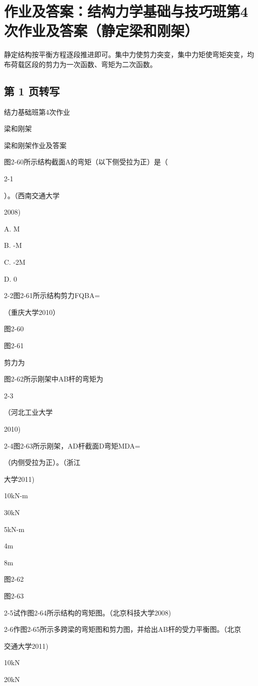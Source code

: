\section{作业及答案：结构力学基础与技巧班第4次作业及答案（静定梁和刚架）}
\begin{analysisbox}
静定结构按平衡方程逐段推进即可。集中力使剪力突变，集中力矩使弯矩突变，均布荷载区段的剪力为一次函数、弯矩为二次函数。
\end{analysisbox}
\subsection*{第 1 页转写}
结力基础班第4次作业

梁和刚架

梁和刚架作业及答案

图2-60所示结构截面A的弯矩（以下侧受拉为正）是（

2-1

）。（西南交通大学

2008)

A. M

B. -M

C. -2M

D. 0

2-2图2-61所示结构剪力FQBA=

（重庆大学2010）

图2-60

图2-61

剪力为

图2-62所示刚架中AB杆的弯矩为

2-3

（河北工业大学

2010)

2-4图2-63所示刚架，AD杆截面D弯矩MDA=

（内侧受拉为正）。（浙江

大学2011)

10kN-m

30kN

5kN-m

4m

8m

图2-62

图2-63

2-5试作图2-64所示结构的弯矩图。（北京科技大学2008)

2-6作图2-65所示多跨梁的弯矩图和剪力图，并给出AB杆的受力平衡图。（北京

交通大学2011)

10kN

20kN

